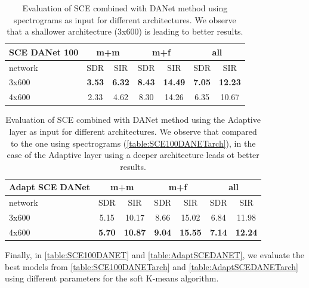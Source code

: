 \documentclass[master, tikz, final,11pt, dvipdfmx]{iscs-thesis}
\begin{document}
\begin{table}[h!]
\centering
\begin{tabular}{l|c|c|c|c|c|c}
SCE DANet 100 & \multicolumn{2}{c|}{m+m} & \multicolumn{2}{c|}{m+f} & \multicolumn{2}{c}{all} \\ 
\hline 
network & SDR & SIR & SDR & SIR & SDR & SIR \\ 
\hline 
3x600 & \textbf{3.53} & \textbf{6.32} & \textbf{8.43} & \textbf{14.49} & \textbf{7.05} & \textbf{12.23} \\ 
4x600 & 2.33 & 4.62 & 8.30 & 14.26 & 6.35 & 10.67 \\  
\end{tabular}
\caption[Evaluation of SCE combined with DANet method using spectrograms as input for different architectures]{Evaluation of SCE combined with DANet method using spectrograms as input for different architectures. We observe that a shallower architecture (3x600) is leading to better results.}
\label{table:SCE100DANETarch}
\end{table}

\begin{table}[h!]
\centering
\begin{tabular}{l|c|c|c|c|c|c}
Adapt SCE DANet & \multicolumn{2}{c|}{m+m} & \multicolumn{2}{c|}{m+f} & \multicolumn{2}{c}{all} \\ 
\hline 
network & SDR & SIR & SDR & SIR & SDR & SIR \\ 
\hline 
3x600 & 5.15 & 10.17 & 8.66 & 15.02 & 6.84 & 11.98 \\ 
4x600 & \textbf{5.70} & \textbf{10.87} & \textbf{9.04} & \textbf{15.55} & \textbf{7.14} & \textbf{12.24} \\  
\end{tabular}
\caption[Evaluation of SCE combined with DANet method using the Adaptive layer as input for different architectures]{Evaluation of SCE combined with DANet method using the Adaptive layer as input for different architectures. We observe that compared to the one using spectrograms (\autoref{table:SCE100DANETarch}), in the case of the Adaptive layer using a deeper architecture leads ot better results.}
\label{table:AdaptSCEDANETarch}
\end{table}

Finally, in \autoref{table:SCE100DANET} and \autoref{table:AdaptSCEDANET}, we evaluate the best models from \autoref{table:SCE100DANETarch} and \autoref{table:AdaptSCEDANETarch} using different parameters for the soft K-means algorithm.
\end{document}
